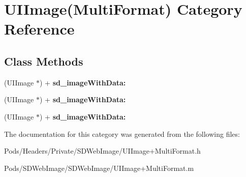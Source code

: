 \hypertarget{category_u_i_image_07_multi_format_08}{}\section{U\+I\+Image(Multi\+Format) Category Reference}
\label{category_u_i_image_07_multi_format_08}
\subsection*{Class Methods}
\begin{DoxyCompactItemize}
\item 
\mbox{\label{category_u_i_image_07_multi_format_08_a86aa344c6f90663de6aff4dd9737d52a}} 
(U\+I\+Image $\ast$) + {\bfseries sd\+\_\+image\+With\+Data\+:}
\item 
\mbox{\label{category_u_i_image_07_multi_format_08_a86aa344c6f90663de6aff4dd9737d52a}} 
(U\+I\+Image $\ast$) + {\bfseries sd\+\_\+image\+With\+Data\+:}
\item 
\mbox{\label{category_u_i_image_07_multi_format_08_a86aa344c6f90663de6aff4dd9737d52a}} 
(U\+I\+Image $\ast$) + {\bfseries sd\+\_\+image\+With\+Data\+:}
\end{DoxyCompactItemize}


The documentation for this category was generated from the following files\+:\begin{DoxyCompactItemize}
\item 
Pods/\+Headers/\+Private/\+S\+D\+Web\+Image/U\+I\+Image+\+Multi\+Format.\+h\item 
Pods/\+S\+D\+Web\+Image/\+S\+D\+Web\+Image/U\+I\+Image+\+Multi\+Format.\+m\end{DoxyCompactItemize}
